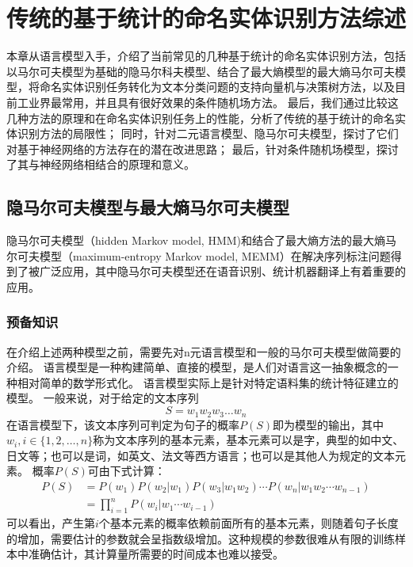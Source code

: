\chapter{传统的基于统计的命名实体识别方法综述}
本章从语言模型入手，介绍了当前常见的几种基于统计的命名实体识别方法，包括以马尔可夫模型为基础的隐马尔科夫模型、结合了最大熵模型的最大熵马尔可夫模型，将命名实体识别任务转化为文本分类问题的支持向量机与决策树方法，以及目前工业界最常用，并且具有很好效果的条件随机场方法。
最后，我们通过比较这几种方法的原理和在命名实体识别任务上的性能，分析了传统的基于统计的命名实体识别方法的局限性；
同时，针对二元语言模型、隐马尔可夫模型，探讨了它们对基于神经网络的方法存在的潜在改进思路；
最后，针对条件随机场模型，探讨了其与神经网络相结合的原理和意义。
\section{隐马尔可夫模型与最大熵马尔可夫模型}
隐马尔可夫模型（hidden Markov model, HMM)和结合了最大熵方法的最大熵马尔可夫模型（maximum-entropy Markov model, MEMM）在解决序列标注问题得到了被广泛应用，其中隐马尔可夫模型还在语音识别、统计机器翻译上有着重要的应用。
\subsection{预备知识}
在介绍上述两种模型之前，需要先对n元语言模型和一般的马尔可夫模型做简要的介绍。
语言模型是一种构建简单、直接的模型，是人们对语言这一抽象概念的一种相对简单的数学形式化。
语言模型实际上是针对特定语料集的统计特征建立的模型。
一般来说，对于给定的文本序列
\begin{equation}
    S = w_1 w_2 w_3 \dots w_n
\end{equation}
在语言模型下，该文本序列可判定为句子的概率$P(S)$即为模型的输出，其中$w_i, i\in \{1,2,\dots,n\}$称为文本序列的基本元素，基本元素可以是字，典型的如中文、日文等；也可以是词，如英文、法文等西方语言；也可以是其他人为规定的文本元素。
概率$P(S)$可由下式计算：
\begin{align}
    \label{eq: language model} P(S) &= P(w_1)P(w_2 | w_1)P(w_3 | w_1 w_2)\cdots P(w_n | w_1 w_2 \cdots w_{n-1})\\
    &= \prod_{i=1}^{n}P(w_i | w_1 \cdots w_{i-1})
\end{align}
可以看出，产生第$i$个基本元素的概率依赖前面所有的基本元素，则随着句子长度的增加，需要估计的参数就会呈指数级增加。这种规模的参数很难从有限的训练样本中准确估计，其计算量所需要的时间成本也难以接受。

